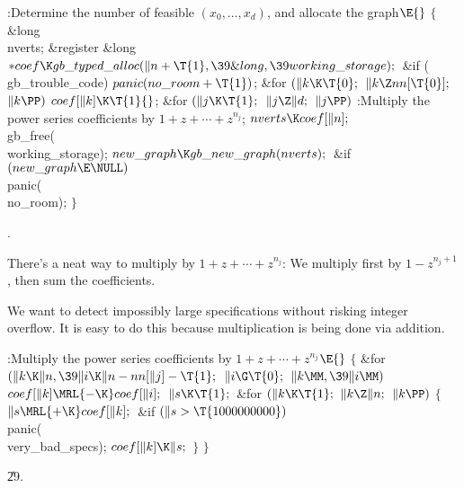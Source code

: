 \Y\B\4:Determine the number of feasible $(x_0,\ldots,x_d)$, and allocate
the graph\X${}\E{}$\6
${}\{{}$\5
\1\&{long} \\{nverts};\6
\&{register} \&{long} ${}{*}\\{coef}\K\\{gb\_typed\_alloc}(\|n+\T{1},\39%
\&{long},\39\\{working\_storage});{}$\7
\&{if} (\\{gb\_trouble\_code})\1\5
${}\\{panic}(\\{no\_room}+\T{1}){}$;\2\6
\&{for} ${}(\|k\K\T{0};{}$ ${}\|k\Z\\{nn}[\T{0}];{}$ ${}\|k\PP){}$\1\5
${}\\{coef}[\|k]\K\T{1}{}$;\2\6
\&{for} ${}(\|j\K\T{1};{}$ ${}\|j\Z\|d;{}$ ${}\|j\PP){}$\1\5
:Multiply the power series coefficients by $1+z+\cdots+z^{n_j}$\X;\2\6
${}\\{nverts}\K\\{coef}[\|n];{}$\6
\\{gb\_free}(\\{working\_storage});\6
${}\\{new\_graph}\K\\{gb\_new\_graph}(\\{nverts});{}$\6
\&{if} ${}(\\{new\_graph}\E\NULL){}$\1\5
\\{panic}(\\{no\_room});\2\6
\4${}\}{}$\2\par
{}.\fi

There's a neat way to multiply by $1+z+\cdots+z^{n_j}$: We multiply
first by $1-z^{n_j+1}$, then sum the coefficients.

We want to detect impossibly large specifications without risking
integer overflow. It is easy to do this because multiplication is being
done via addition.

\Y\B\4:Multiply the power series coefficients by $1+z+\cdots+z^{n_j}$\X${}%
\E{}$\6
${}\{{}$\1\6
\&{for} ${}(\|k\K\|n,\39\|i\K\|n-\\{nn}[\|j]-\T{1};{}$ ${}\|i\G\T{0};{}$ ${}\|k%
\MM,\39\|i\MM){}$\1\5
${}\\{coef}[\|k]\MRL{-{\K}}\\{coef}[\|i];{}$\2\6
${}\|s\K\T{1};{}$\6
\&{for} ${}(\|k\K\T{1};{}$ ${}\|k\Z\|n;{}$ ${}\|k\PP){}$\5
${}\{{}$\1\6
${}\|s\MRL{+{\K}}\\{coef}[\|k];{}$\6
\&{if} ${}(\|s>\T{1000000000}){}$\1\5
\\{panic}(\\{very\_bad\_specs});\2\6
${}\\{coef}[\|k]\K\|s;{}$\6
\4${}\}{}$\2\6
\4${}\}{}$\2\par
\U29.\fi

